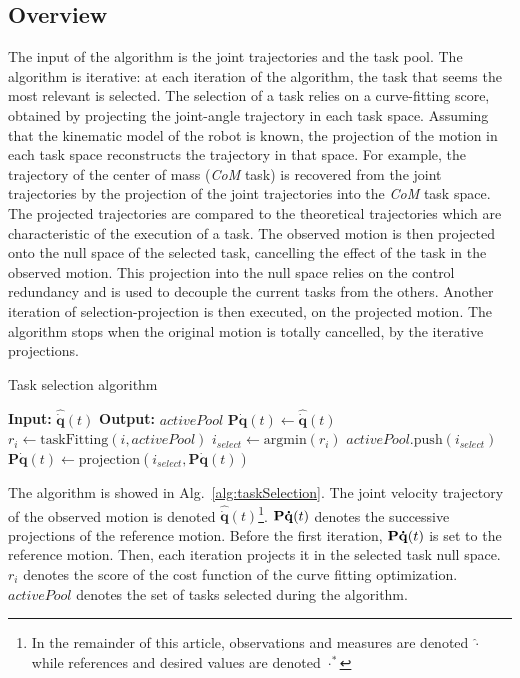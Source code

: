 \documentclass[journal]{IEEEtran}
\begin{document}
\subsection{Overview}
\label{sec:alg1:selec}
The input of the algorithm is the joint trajectories and
the task pool. The algorithm is iterative: at each iteration of the algorithm, the task that seems the
most relevant is selected. The selection of a task relies
on a curve-fitting score, obtained by projecting the joint-angle trajectory in each task space.
Assuming that the kinematic model of the robot is known,
the projection of the motion in each task space reconstructs the trajectory in that space.
For example, the trajectory of the center of mass (\emph{CoM} task) is
recovered from the joint trajectories by the projection
of the joint trajectories into the \emph{CoM} task space.
The projected trajectories are
compared to the theoretical trajectories which are characteristic
of the execution of a task.
The observed motion is then projected
onto the null space of the selected task, cancelling the effect of the task in the observed motion.
This projection into the null space relies on the control redundancy and
is used to decouple the current tasks from the others.
Another iteration of selection-projection is then executed, on the projected motion.
The algorithm stops when the original motion is totally cancelled, by the iterative projections.
\newcommand{\shOUTPUT}{\textbf{Output: }}
\newcommand{\shINPUT}{\textbf{Input: }}

\begin{algorithm}[t]
  \caption{Task selection algorithm}
  \label{alg:taskSelection}
\begin{algorithmic}[1]
  \STATE \shINPUT $\mathbf{\hat{\dot{q}}}(t)$
\STATE \shOUTPUT $activePool$
\STATE $\mathbf{P}\mathbf{\dot{q}}(t)\gets \mathbf{\hat{\dot{q}}}(t)$
    \STATE $r_i \gets \mathrm{taskFitting}(i, activePool)$
  \ENDFOR
  \STATE $i_{select} \gets \mathrm{argmin}(r_i)$
  \STATE $activePool.\mathrm{push}(i_{select})$
  \STATE $\mathbf{P}\mathbf{\dot{q}}(t) \gets \mathrm{projection}(i_{select}, \mathbf{P}\mathbf{\dot{q}}(t))$
\ENDWHILE
\end{algorithmic}
\end{algorithm}
The algorithm is showed in Alg.~\ref{alg:taskSelection}.
The joint velocity trajectory
of the observed motion is denoted $\mathbf{\hat{\dot{q}}}(t)$\footnote{In the remainder of this article, observations
and measures are denoted $\hat{\cdot}$ while references and desired values are denoted $\cdot^*$}.
${\mathbf{P\dot{q}}}(t)$ denotes the successive projections of the reference
motion. Before the first iteration, ${\mathbf{P\dot{q}}}(t)$ is set to the reference motion.
Then, each iteration projects it in the selected task null space.
$r_i$ denotes the score of the cost function of the curve fitting optimization. $activePool$ denotes
the set of tasks selected during the algorithm.
\end{document}
